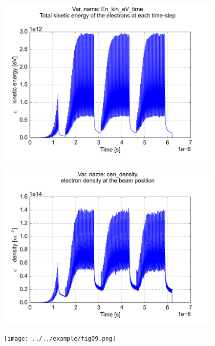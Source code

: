 \documentclass[a4paper,12pt]{article}
\begin{document}
\begin{figure}[p]
\begin{center}
\includegraphics[trim = 0 0 0 0, clip, width=.95\textwidth]{../../example/fig07.png}
\end{center}
\end{figure}

\begin{figure}[p]
\begin{center}
\includegraphics[trim = 0 0 0 0, clip, width=.95\textwidth]{../../example/fig08.png}
\end{center}
\end{figure}

\begin{figure}[p]
\begin{center}
\texttt{[image: ../../example/fig09.png]}
\end{center}
\end{figure}
\end{document}

